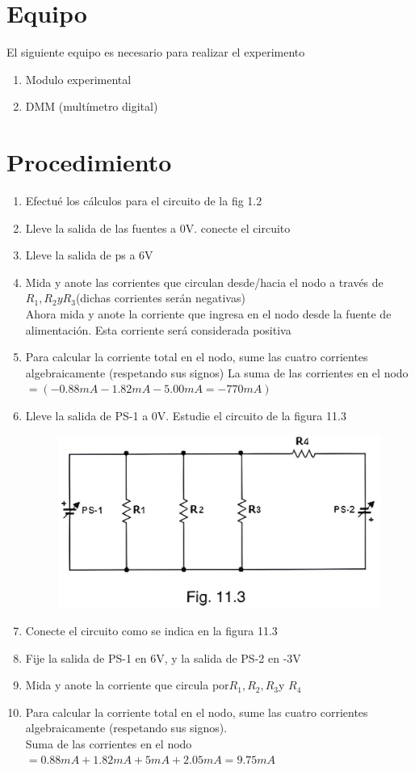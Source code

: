 \section{Equipo}
El siguiente equipo es necesario para realizar el experimento 
\begin{enumerate}
	
	\item	Modulo experimental
 \item	DMM (multímetro digital)
	
\end{enumerate}
\section{Procedimiento}
\begin{enumerate}
	\item 	Efectué los cálculos para el circuito de la fig 1.2
\item	Lleve la salida de las fuentes a 0V. conecte el circuito
\item 	Lleve la salida de ps a 6V
\item Mida y anote las corrientes que circulan desde/hacia el nodo a través de $R_{1},R_{2}  y R_{3}$(dichas corrientes serán negativas)\\
Ahora mida y anote la corriente que ingresa en el nodo desde la fuente de alimentación. Esta corriente será considerada positiva
\item 	Para calcular la corriente total en el nodo, sume las cuatro corrientes algebraicamente (respetando sus signos)
La suma de las corrientes en el nodo $= (-0.88mA-1.82mA-5.00mA=-770mA)$
\item Lleve la salida de PS-1 a 0V. Estudie el circuito de la figura 11.3
\begin{figure}[h]
	\centering
	\includegraphics[scale=0.2]{imagenes/2}
\end{figure}
	\item 	Conecte el circuito como se indica en la figura 11.3
\item 	Fije la salida de PS-1 en 6V, y la salida de PS-2 en -3V
	\item 	Mida y anote la corriente que circula por$ R_{1},R_{2},R_{3} $y $ R_{4}$
	\item 	Para calcular la corriente total en el nodo, sume las cuatro corrientes algebraicamente (respetando sus signos).\\
	Suma de las corrientes en el nodo $= 0.88mA+1.82mA+5mA+2.05mA=9.75mA$
	
\end{enumerate}
